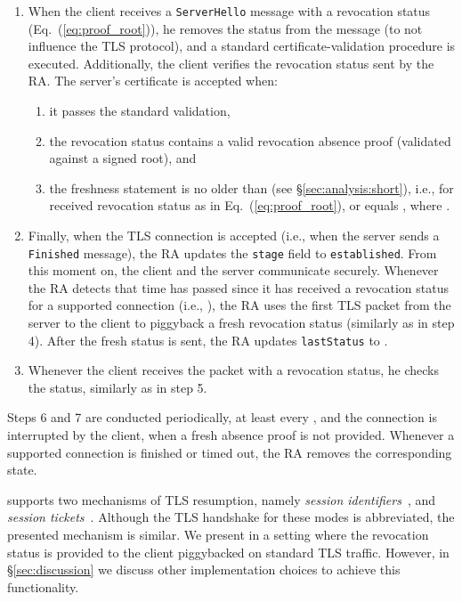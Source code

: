 \begin{enumerate}[leftmargin=*]
  \item When the client receives a \texttt{ServerHello} message with a
    revocation status (Eq.~(\ref{eq:proof_root})), he removes the status from
    the message (to not influence the TLS protocol), and a standard
    certificate-validation procedure is executed.  Additionally, the client
    verifies the revocation status sent by the RA. The server's certificate
    is accepted when:
    \begin{enumerate}
        \item it passes the standard validation,
        \item the revocation status contains a valid revocation absence proof
        (validated against a signed root), and
    	\item the freshness statement is no older than  (see
        \S\ref{sec:analysis:short}), i.e., for received revocation status
        as in Eq.~(\ref{eq:proof_root}),  or
         equals , where
        .
    \end{enumerate}

  \item Finally, when the TLS connection is accepted (i.e., when the server
    sends a \texttt{Finished} message), the RA updates the \texttt{stage} field
    to \texttt{established}.  From this moment on, the client and the server
    communicate securely. Whenever the RA detects that  time has passed
    since it has received a revocation status for a supported connection (i.e.,
    ), the RA uses the first
    TLS packet from the server to the client to piggyback a fresh revocation
    status (similarly as in step 4). After the fresh status is sent, the RA
    updates \texttt{lastStatus} to .

  \item Whenever the client receives the packet with a revocation status, he
    checks the status, similarly as in step 5.
\end{enumerate}
Steps 6 and 7 are conducted periodically, at least every , and the
connection is interrupted by the client, when a fresh absence proof is not
provided. Whenever a supported connection is finished or timed out, the RA
removes the corresponding state.

\name supports two mechanisms of TLS resumption, namely \textit{session
identifiers}~\cite{rfc5246}, and \textit{session tickets}~\cite{rfc5077}.
Although the TLS handshake for these modes is abbreviated, the presented
mechanism is similar. We present \name in a setting where the revocation status
is provided to the client piggybacked on standard TLS traffic. However, in
\S\ref{sec:discussion} we discuss other implementation choices to achieve this
functionality.

